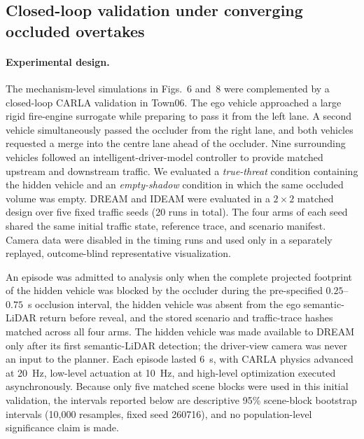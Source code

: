 
\subsection{Closed-loop validation under converging occluded overtakes}
\label{sec:carla-validation}

\paragraph{Experimental design.}
The mechanism-level simulations in Figs.~6 and~8 were complemented by a
closed-loop CARLA validation in Town06.  The ego vehicle approached a large
rigid fire-engine surrogate while preparing to pass it from the left lane.  A
second vehicle simultaneously passed the occluder from the right lane, and
both vehicles requested a merge into the centre lane ahead of the occluder.
Nine surrounding vehicles followed an intelligent-driver-model controller to
provide matched upstream and downstream traffic.  We evaluated a
\emph{true-threat} condition containing the hidden vehicle and an
\emph{empty-shadow} condition in which the same occluded volume was empty.
DREAM and IDEAM were evaluated in a $2\times2$ matched design over five fixed
traffic seeds (20 runs in total).  The four arms of each seed shared the same
initial traffic state, reference trace, and scenario manifest.  Camera data
were disabled in the timing runs and used only in a separately replayed,
outcome-blind representative visualization.

An episode was admitted to analysis only when the complete projected
footprint of the hidden vehicle was blocked by the occluder during the
pre-specified $0.25$--$0.75$~s occlusion interval, the hidden vehicle was absent
from the ego semantic-LiDAR return before reveal, and the stored scenario and
traffic-trace hashes matched across all four arms.  The hidden vehicle was
made available to DREAM only after its first semantic-LiDAR detection; the
driver-view camera was never an input to the planner.  Each episode lasted
6~s, with CARLA physics advanced at 20~Hz, low-level actuation at 10~Hz, and
high-level optimization executed asynchronously.  Because only five matched
scene blocks were used in this initial validation, the intervals reported
below are descriptive 95\% scene-block bootstrap intervals (10,000 resamples,
fixed seed 260716), and no population-level significance claim is made.


